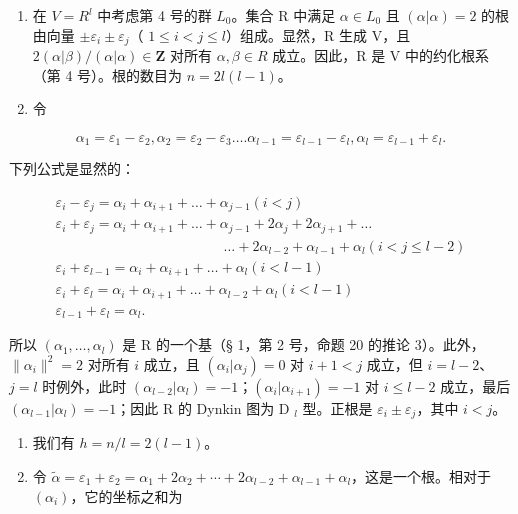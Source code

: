 \begin{enumerate}
\def\labelenumi{(\Roman{enumi})}
\item
  在 \(V = R^{l}\) 中考虑第 4 号的群 \(L_{0}\)。集合 R 中满足 \(\alpha \in L_{0}\) 且 \((\alpha|\alpha) = 2\) 的根由向量 \(\pm\varepsilon_{i} \pm \varepsilon_{j}\)（ \(1 \leqslant i < j \leqslant l\)）组成。显然，R 生成 V，且 \(2(\alpha|\beta)/(\alpha|\alpha) \in \mathbf{Z}\) 对所有 \(\alpha, \beta \in R\) 成立。因此，R 是 V 中的约化根系（第 4 号）。根的数目为 \(n = 2l(l - 1)\)。
\item
  令
\end{enumerate}

\[
\alpha_ {1} = \varepsilon_ {1} - \varepsilon_ {2}, \alpha_ {2} = \varepsilon_ {2} - \varepsilon_ {3} \dots . \alpha_ {l - 1} = \varepsilon_ {l - 1} - \varepsilon_ {l}, \alpha_ {l} = \varepsilon_ {l - 1} + \varepsilon_ {l}.
\]

下列公式是显然的：

\[
\begin{array}{c} \varepsilon_ {i} - \varepsilon_ {j} = \alpha_ {i} + \alpha_ {i + 1} + \dots + \alpha_ {j - 1} (i <   j) \\ \varepsilon_ {i} + \varepsilon_ {j} = \alpha_ {i} + \alpha_ {i + 1} + \dots + \alpha_ {j - 1} + 2 \alpha_ {j} + 2 \alpha_ {j + 1} + \dots \\ \qquad \qquad \qquad \qquad \qquad \qquad \dots + 2 \alpha_ {l - 2} + \alpha_ {l - 1} + \alpha_ {l} (i <   j \leqslant l - 2) \\ \varepsilon_ {i} + \varepsilon_ {l - 1} = \alpha_ {i} + \alpha_ {i + 1} + \dots + \alpha_ {l} (i <   l - 1) \\ \varepsilon_ {i} + \varepsilon_ {l} = \alpha_ {i} + \alpha_ {i + 1} + \dots + \alpha_ {l - 2} + \alpha_ {l} (i <   l - 1) \\ \varepsilon_ {l - 1} + \varepsilon_ {l} = \alpha_ {l}. \end{array}
\]

所以 \((\alpha_{1},\ldots,\alpha_{l})\) 是 R 的一个基（§ 1，第 2 号，命题 20 的推论 3）。此外，\(\| \alpha_{i}\|^{2}=2\) 对所有 \(i\) 成立，且 \((\alpha_{i}|\alpha_{j})=0\) 对 \(i+1<j\) 成立，但 \(i=l-2\)、\(j=l\) 时例外，此时 \((\alpha_{l-2}|\alpha_{l})=-1\)；\((\alpha_{i}|\alpha_{i+1})=-1\) 对 \(i\leqslant l-2\) 成立，最后 \((\alpha_{l-1}|\alpha_{l})=-1\)；因此 R 的 Dynkin 图为 D \(_{l}\) 型。正根是 \(\varepsilon_{i}\pm\varepsilon_{j}\)，其中 \(i<j\)。

\begin{enumerate}
\def\labelenumi{(\Roman{enumi})}
\setcounter{enumi}{2}
\item
  我们有 \(h = n / l = 2(l - 1)\)。
\item
  令 \(\tilde{\alpha} = \varepsilon_{1} + \varepsilon_{2} = \alpha_{1} + 2\alpha_{2} + \cdots + 2\alpha_{l-2} + \alpha_{l-1} + \alpha_{l}\)，这是一个根。相对于 \((\alpha_{i})\)，它的坐标之和为
\end{enumerate}

